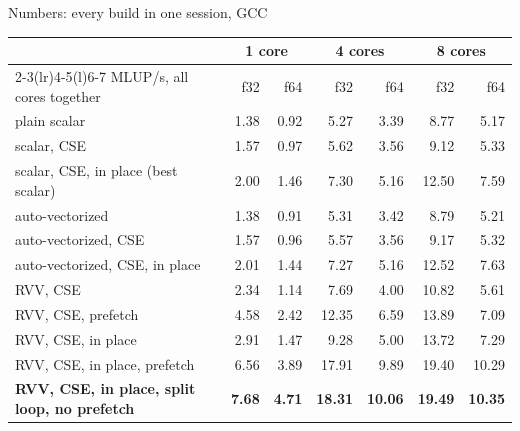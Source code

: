 \documentclass[aspectratio=169,10pt,t]{beamer}
\begin{document}
\begin{frame}{Numbers: every build in one session, GCC}
  \vspace{1mm}
  \centering
  {\footnotesize\renewcommand{\arraystretch}{1.05}
  \begin{tabular}{@{}lrrrrrr@{}}
    \toprule
    & \multicolumn{2}{c}{\textbf{1 core}} & \multicolumn{2}{c}{\textbf{4 cores}}
      & \multicolumn{2}{c}{\textbf{8 cores}}\\
    \cmidrule(lr){2-3}\cmidrule(lr){4-5}\cmidrule(l){6-7}
    MLUP/s, all cores together & f32 & f64 & f32 & f64 & f32 & f64\\
    \midrule
    plain scalar & 1.38 & 0.92 & 5.27 & 3.39 & 8.77 & 5.17\\
    scalar, CSE & 1.57 & 0.97 & 5.62 & 3.56 & 9.12 & 5.33\\
    scalar, CSE, in place (best scalar) & 2.00 & 1.46 & 7.30 & 5.16 & 12.50 & 7.59\\
    \midrule
    auto-vectorized & 1.38 & 0.91 & 5.31 & 3.42 & 8.79 & 5.21\\
    auto-vectorized, CSE & 1.57 & 0.96 & 5.57 & 3.56 & 9.17 & 5.32\\
    auto-vectorized, CSE, in place & 2.01 & 1.44 & 7.27 & 5.16 & 12.52 & 7.63\\
    \midrule
    RVV, CSE & 2.34 & 1.14 & 7.69 & 4.00 & 10.82 & 5.61\\
    RVV, CSE, prefetch & 4.58 & 2.42 & 12.35 & 6.59 & 13.89 & 7.09\\
    RVV, CSE, in place & 2.91 & 1.47 & 9.28 & 5.00 & 13.72 & 7.29\\
    RVV, CSE, in place, prefetch & 6.56 & 3.89 & 17.91 & 9.89 & 19.40 & 10.29\\
    \textbf{RVV, CSE, in place, split loop, no prefetch} & \textbf{7.68} & \textbf{4.71} & \textbf{18.31}
      & \textbf{10.06} & \textbf{19.49} & \textbf{10.35}\\
    \bottomrule
  \end{tabular}\par}


\end{frame}
\end{document}
